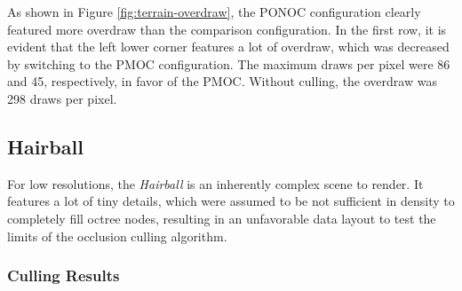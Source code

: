 \noindent
As shown in Figure \ref{fig:terrain-overdraw}, the \ac{PONOC} configuration clearly 
featured more overdraw than the comparison configuration. In the first row, it is evident that 
the left lower corner features a lot of overdraw, which was decreased by switching to the 
\ac{PMOC} configuration. The maximum draws per pixel were 86 and 45, respectively, in 
favor of the \ac{PMOC}. Without culling, the overdraw was 298 draws per pixel.

\clearpage



\subsection*{Hairball}

For low resolutions, the \emph{Hairball} is an inherently complex scene to render. It features a lot 
of tiny details, which were assumed to be not sufficient in density to completely fill octree nodes, 
resulting in an unfavorable data layout to test the limits of the occlusion culling algorithm.

\subsubsection*{Culling Results} \label{subsubsec-culling-results-hairball}


